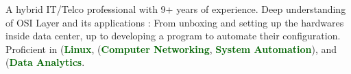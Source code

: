 
\begin{cvparagraph}

A hybrid IT/Telco professional with 9+ years of experience. Deep understanding of OSI Layer and its applications : From unboxing and setting up the hardwares inside data center, up to developing a program to automate their configuration. Proficient in (\textcolor{darkgreen}{\textbf{Linux}}, (\textcolor{darkgreen}{\textbf{Computer Networking}}, \textcolor{darkgreen}{\textbf{System Automation}}), and (\textcolor{darkgreen}{\textbf{Data Analytics}}.
\end{cvparagraph}

